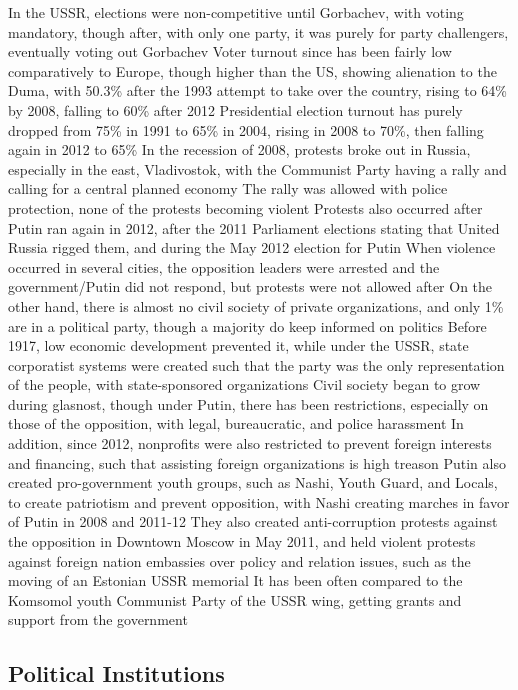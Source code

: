 \documentclass[11 pt, twoside]{article}
\newenvironment{outline*}
{
	\begin{outline}[enumerate]
	}
	{\end{outline}
}
\begin{document}
\begin{outline*}
\1 In the USSR, elections were non-competitive until Gorbachev, with voting mandatory, though after, with only one party, it was purely for party challengers, eventually voting out Gorbachev
\2 Voter turnout since has been fairly low comparatively to Europe, though higher than the US, showing alienation to the Duma, with 50.3\% after the 1993 attempt to take over the country, rising to 64\% by 2008, falling to 60\% after 2012
\2 Presidential election turnout has purely dropped from 75\%  in 1991 to 65\% in 2004, rising in 2008 to 70\%, then falling again in 2012 to 65\%
\1 In the recession of 2008, protests broke out in Russia, especially in the east, Vladivostok, with the Communist Party having a rally and calling for a central planned economy
\2 The rally was allowed with police protection, none of the protests becoming violent
\2 Protests also occurred after Putin ran again in 2012, after the 2011 Parliament elections stating that United Russia rigged them, and during the May 2012 election for Putin
\3 When violence occurred in several cities, the opposition leaders were arrested and the government/Putin did not respond, but protests were not allowed after
\1 On the other hand, there is almost no civil society of private organizations, and only 1\% are in a political party, though a majority do keep informed on politics
\2 Before 1917, low economic development prevented it, while under the USSR, state corporatist systems were created such that the party was the only representation of the people, with state-sponsored organizations
\2 Civil society began to grow during glasnost, though under Putin, there has been restrictions, especially on those of the opposition, with legal, bureaucratic, and police harassment
\3 In addition, since 2012, nonprofits were also restricted to prevent foreign interests and financing, such that assisting foreign organizations is high treason
\2 Putin also created pro-government youth groups, such as Nashi, Youth Guard, and Locals, to create patriotism and prevent opposition, with Nashi creating marches in favor of Putin in 2008 and 2011-12
\3 They also created anti-corruption protests against the opposition in Downtown Moscow in May 2011, and held violent protests against foreign nation embassies over policy and relation issues, such as the moving of an Estonian USSR memorial
\3 It has been often compared to the Komsomol youth Communist Party of the USSR wing, getting grants and support from the government
\end{outline*}
\subsection{Political Institutions}
\end{document}
